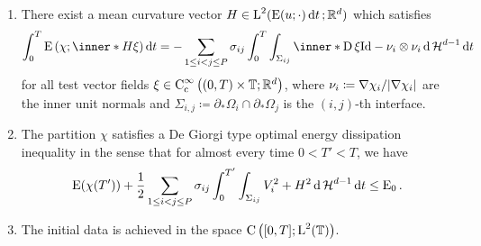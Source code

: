 \begin{definition}
\begin{enumerate}
		\item 
		There exist a mean curvature vector $ H \in 
		\operatorname{L}^{ 2 } ( \operatorname{E} ( u ; \cdot) \dd{ t } ; \mathbb{ R }^{ d } ) $ 
		which satisfies
		\begin{equation}
			\label{mean_curvature_vector_bv_de_giorgi}
			\int_{ 0 }^{ T }
				\energy \left( \chi ; \inner*{ H }{ \xi } \right)
			\dd{ t }
			=
			-
			\sum_{ 1 \leq i < j \leq P }
			\sigma_{ i j }
			\int_{ 0 }^{ T }
				\int_{ \Sigma_{ i j } }
					\inner*{
						\diff \xi }
					{ \mathrm{Id} - \nu_{ i } \otimes \nu_{ i } }
				\dd{ \hm^{ d - 1 } }
			\dd{ t }
		\end{equation}
		for all test vector fields 
		$ \xi \in \operatorname{C}_{ \mathrm{c} }^{ \infty } \left(
			( 0 , T ) \times \operatorname{\mathbb{T}} ; \mathbb{ R }^{ d }
		\right) $,
		where $ \nu_{ i } \coloneqq \nabla \chi_{ i } / \abs{ \nabla \chi_{ i } 
		} $ are the inner unit normals and $ \Sigma_{ i , j } \coloneqq 
		\partial_{ \ast } \Omega_{ i } \cap \partial_{ \ast } \Omega_{ j } $
		is the $ (i, j )$-th interface.
		
		\item 
		The partition $ \chi $ satisfies a De Giorgi type optimal energy 
		dissipation inequality in the sense that for almost every time $ 0 < T' 
		< T $, we have
		\begin{equation*}
			\operatorname{E} ( \chi ( T' ) )
			+
			\frac{ 1 }{ 2 }
			\sum_{ 1 \leq i < j \leq P }
				\sigma_{ i j }
				\int_{ 0 }^{ T' }
					\int_{ \Sigma_{ i j } }
						V_{ i }^{ 2 }
						+
						H^{ 2 }
					\dd{ \operatorname{\mathcal{H}}^{ d - 1 } }
				\dd{ t }
			\leq
			\operatorname{E}_{ 0 }.
		\end{equation*}
		
		\item
		The initial data is achieved in the space $ \operatorname{C} \left( [ 0 , T ] ; 
		\operatorname{L}^{ 2 } ( \operatorname{\mathbb{T}} ) \right) $.
	\end{enumerate}
\end{definition}

